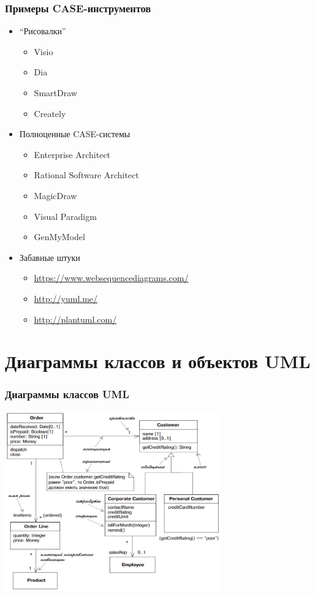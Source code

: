 \documentclass[xetex,mathserif,serif]{beamer}
\begin{document}
	\begin{frame}
		\frametitle{Примеры CASE-инструментов}
		\begin{itemize}
			\item ``Рисовалки''
			\begin{itemize}
				\item Visio
				\item Dia
				\item SmartDraw
				\item Creately
			\end{itemize}
			\item Полноценные CASE-системы
			\begin{itemize}
				\item Enterprise Architect
				\item Rational Software Architect
				\item MagicDraw
				\item Visual Paradigm
				\item GenMyModel
			\end{itemize}
			\item Забавные штуки
			\begin{itemize}
				\item \url{https://www.websequencediagrams.com/}
				\item \url{http://yuml.me/}
				\item \url{http://plantuml.com/}
			\end{itemize}
		\end{itemize}
	\end{frame}

	\section{Диаграммы классов и объектов UML}

	\begin{frame}
		\frametitle{Диаграммы классов UML}
		\begin{center}
			\includegraphics[width=0.7\textwidth]{umlClassDiagram.png}
		\end{center}
	\end{frame}
\end{document}
